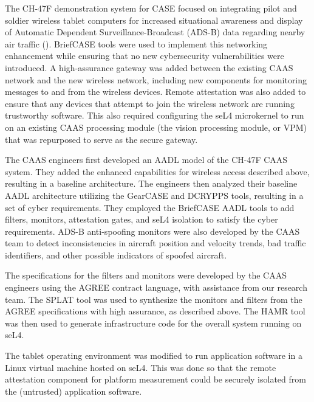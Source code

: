 The CH-47F demonstration system
for CASE focused on integrating pilot and soldier wireless tablet computers for
increased situational awareness and display of Automatic Dependent Surveillance-Broadcast (ADS-B)
data regarding nearby air traffic ().  
BriefCASE tools were used to implement this networking enhancement while ensuring that no new cybersecurity
vulnerabilities were introduced.  A high-assurance gateway was added between the existing CAAS 
network and the new wireless network, including new components for monitoring messages to and from the wireless 
devices.  Remote attestation was also added to ensure that any devices that attempt to join the wireless network
are running trustworthy software.   
This also required configuring the seL4 microkernel to run on an existing CAAS
processing module (the vision processing module, or VPM) that was repurposed to serve as the secure gateway.  


The CAAS engineers first developed an AADL model of the CH-47F CAAS system. They added the
enhanced capabilities for wireless access described above, resulting in a baseline architecture. The 
engineers then analyzed their baseline AADL architecture utilizing the GearCASE and DCRYPPS tools,
resulting in a set of cyber requirements. They employed the BriefCASE AADL tools to add
filters, monitors, attestation gates, and seL4 isolation to satisfy the cyber
requirements. ADS-B anti-spoofing monitors were also developed by the CAAS team to 
detect inconsistencies in aircraft position and velocity trends,
bad traffic identifiers, and other possible indicators of spoofed aircraft.

The specifications for the filters and monitors were developed by the CAAS engineers
using the AGREE contract language, with assistance from our research team.  The SPLAT tool was
used to synthesize the monitors and filters from the AGREE specifications
with high assurance, as described above. The HAMR tool was then used
to generate infrastructure code for the overall system running on seL4.

The tablet operating environment was modified to run application software in a Linux virtual machine
hosted on seL4.  This was done so that the remote attestation component for platform measurement could
be securely isolated from the (untrusted) application software.  

